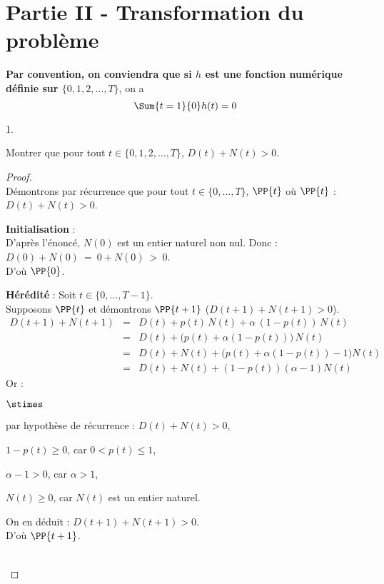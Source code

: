 \section*{Partie II - Transformation du problème}

\noindent
{\bf Par convention, on conviendra que si $h$ est une fonction 
numérique définie sur $\{0,1,2, \ldots, T\}$}, on a
\[
  \Sum{t=1}{0} h(t)=0
\]

\begin{noliste}{1.}
  \setlength{\itemsep}{4mm}
  \setcounter{enumi}{4}
  \item Montrer que pour tout $t \in \{0,1,2, \ldots, T\}$, $D(t) 
  +N(t) >0$.
  
  \begin{proof}~\\
    Démontrons par récurrence que pour tout $t\in \{0, \ldots, T\}$,
    $\PP{t}$ \quad où \quad $\PP{t}$ : $D(t)+N(t) >0$.
    \begin{noliste}{\fitem}
      \item {\bf Initialisation} :\\
      D'après l'énoncé, $N(0)$ est un entier naturel non nul. Donc :
      $D(0) + N(0) \ = \ 0 + N(0) \ > \ 0$.\\
      D'où $\PP{0}$.
      
      \item {\bf Hérédité} : Soit $t\in \{0, \ldots, T-1\}$.\\
      Supposons $\PP{t}$ et démontrons $\PP{t+1}$ (\ie $D(t+1) + 
      N(t+1) >0$).
      \[
        \begin{array}{rcl}
          D(t+1) + N(t+1) &=& D(t) + p(t) \, N(t) + \alpha \, 
          (1-p(t)) \, N(t)
          \\[.2cm]
          &=& D(t) + \big(p(t) + \alpha(1-p(t))\big) \, N(t)
          \\[.2cm]
          &=& D(t) + N(t) + \big(p(t) + \alpha (1-p(t)) -1\big) N(t)
          \\[.2cm]
          &=& D(t) + N(t) + (1-p(t))(\alpha -1) N(t)
        \end{array}
      \]
      Or :
      \begin{noliste}{$\stimes$}
	\item par hypothèse de récurrence : $D(t) + N(t) >0$,
	\item $1-p(t)\geq 0$, car $0<p(t) \leq 1$,
	\item $\alpha -1>0$, car $\alpha >1$,
	\item $N(t) \geq 0$, car $N(t)$ est un entier naturel.
      \end{noliste}
      On en déduit : $D(t+1) + N(t+1) >0$.\\
      D'où $\PP{t+1}$.
    \end{noliste}
    ~\\[-1cm]
  \end{proof}
  

\end{noliste}
